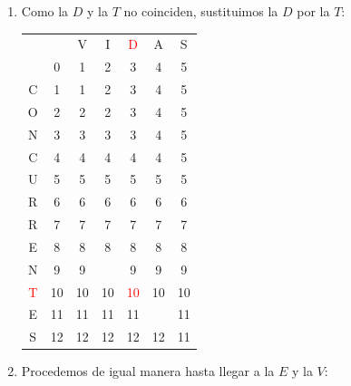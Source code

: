 \documentclass[10pt,a4paper,spanish]{report}
\theoremstyle{definition}
\theoremstyle{remark}
\begin{document}
\begin{enumerate}
\item Como la $D$ y la $T$ no coinciden, sustituimos la $D$ por la $T$:
\begin{center}
\begin{tabular}{c|c|c|c|c|c|c|}
\multicolumn{2}{r}{} & \multicolumn{1}{c}{V} & \multicolumn{1}{c}{I} & \multicolumn{1}{c}{\textcolor{Red}{D}} & \multicolumn{1}{c}{A} & \multicolumn{1}{c}{S} \\ 
\cline{2-7} 
& $0$ & 1 & 2 & 3 & 4 & 5 \\
\cline{2-7} 
C & 1 & 1 & 2 & 3 & 4 & 5 \\
\cline{2-7}
O & 2 & 2 & 2 & 3 & 4 & 5 \\
\cline{2-7} 
N & 3 & 3 & 3 & 3 & 4 & 5 \\
\cline{2-7} 
C & 4 & 4 & 4 & 4 & 4 & 5 \\
\cline{2-7} 
U & 5 & 5 & 5 & 5 & 5 & 5 \\
\cline{2-7} 
R & 6 & 6 & 6 & 6 & 6 & 6 \\
\cline{2-7} 
R & 7 & 7 & 7 & 7 & 7 & 7 \\
\cline{2-7} 
E & 8 & 8 & 8 & 8 & 8 & 8 \\
\cline{2-7} 
N & 9 & 9 & \cellcolor{Cyan}{9} & 9 & 9 & 9 \\
\cline{2-7} 
\textcolor{Red}{T} & 10 & 10 & 10 & \textcolor{Red}{10} & 10 & 10 \\
\cline{2-7} 
E & 11 & 11 & 11 & 11 & \cellcolor{Green}{11} & 11 \\
\cline{2-7} 
S & 12 & 12 & 12 & 12 & 12 & \cellcolor{Green}11 \\
\cline{2-7}
\end{tabular}
\end{center}

\item Procedemos de igual manera hasta llegar a la $E$ y la $V$:


\end{enumerate}
\end{document}
